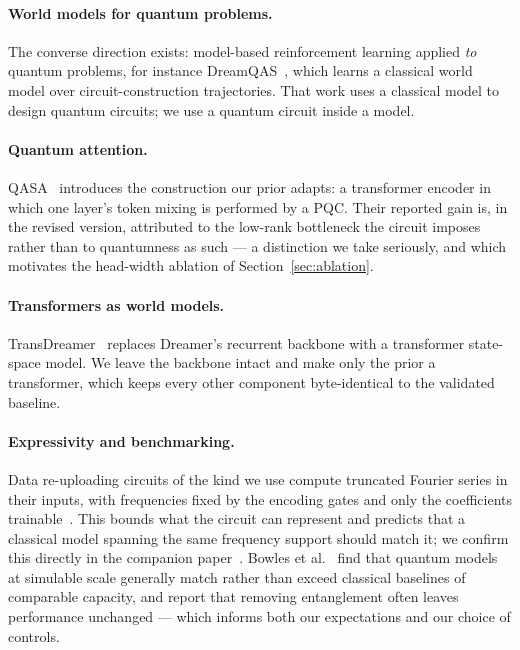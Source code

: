 \documentclass[11pt]{article}
\begin{document}
\paragraph{World models for quantum problems.} The converse direction
exists: model-based reinforcement learning applied \emph{to} quantum
problems, for instance DreamQAS~\cite{dreamqas}, which learns a
classical world model over circuit-construction trajectories. That work
uses a classical model to design quantum circuits; we use a quantum
circuit inside a model.

\paragraph{Quantum attention.} QASA~\cite{qasa} introduces the
construction our prior adapts: a transformer encoder in which one
layer's token mixing is performed by a PQC. Their reported gain is, in
the revised version, attributed to the low-rank bottleneck the circuit
imposes rather than to quantumness as such --- a distinction we take
seriously, and which motivates the head-width ablation of
Section~\ref{sec:ablation}.

\paragraph{Transformers as world models.} TransDreamer~\cite{transdreamer}
replaces Dreamer's recurrent backbone with a transformer state-space
model. We leave the backbone intact and make only the prior a
transformer, which keeps every other component byte-identical to the
validated baseline.

\paragraph{Expressivity and benchmarking.} Data re-uploading circuits of
the kind we use compute truncated Fourier series in their inputs, with
frequencies fixed by the encoding gates and only the coefficients
trainable~\cite{schuld2021}. This bounds what the circuit can represent
and predicts that a classical model spanning the same frequency support
should match it; we confirm this directly in the companion
paper~\cite{papera}. Bowles et al.~\cite{bowles2024} find that quantum
models at simulable scale generally match rather than exceed classical
baselines of comparable capacity, and report that removing entanglement
often leaves performance unchanged --- which informs both our
expectations and our choice of controls.
\end{document}

